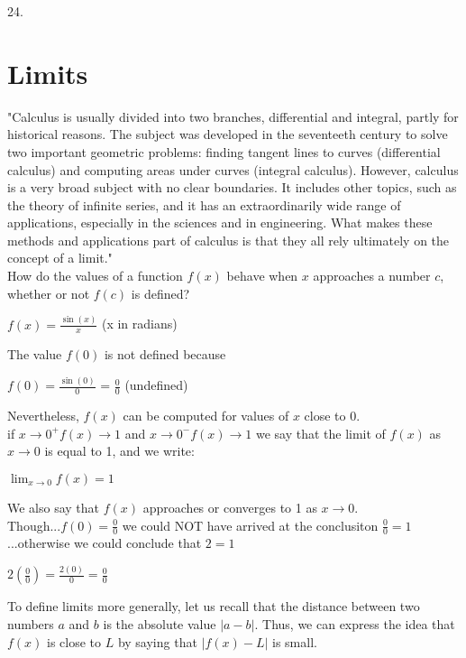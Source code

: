 \documentclass{article}
\begin{document}
24.

\section* {Limits}

"Calculus is usually divided into two branches, differential and integral, partly for historical reasons. The subject was developed in the seventeeth century to solve two important geometric problems: finding tangent lines to curves (differential calculus) and computing areas under curves (integral calculus). However, calculus is a very broad subject with no clear boundaries. It includes other topics, such as the theory of infinite series, and it has an extraordinarily wide range of applications, especially in the sciences and in engineering. What makes these methods and applications part of calculus is that they all rely ultimately on the concept of a limit."\\

\noindent How do the values of a function $f(x)$ behave when $x$ approaches a number $c$, whether or not $f(c)$ is defined?\\

\begin{center}$f(x) = \frac{\sin(x)}{x}$ (x in radians)\end{center}
The value $f(0)$ is not defined because
\begin{center}$f(0) = \frac{\sin(0)}{0}$ = $\frac{0}{0}$ (undefined)\end{center}
Nevertheless, $f(x)$ can be computed for values of $x$ close to 0.\\

if $x \to 0^+ f(x) \to 1$ and $x \to 0^- f(x) \to 1$ we say that the limit of $f(x)$ as $x \to 0$ is equal to 1, and we write:
\begin{center}$\lim_{x \to 0}f(x) = 1$\end{center}
We also say that $f(x)$ approaches or converges to 1 as $x \to 0$.\\

\noindent Though...$f(0) = \frac{0}{0}$ we could NOT have arrived at the conclusiton $\frac{0}{0} = 1$...otherwise we could conclude that $2=1$
\begin{center}$2(\frac{0}{0}) = \frac{2(0)}{0} = \frac{0}{0}$\end{center}

To define limits more generally, let us recall that the distance between two numbers $a$ and $b$ is the absolute value $\left|a-b\right|$. Thus, we can express the idea that $f(x)$ is close to $L$ by saying that $\left|f(x) - L\right|$ is small.\\
\end{document}
